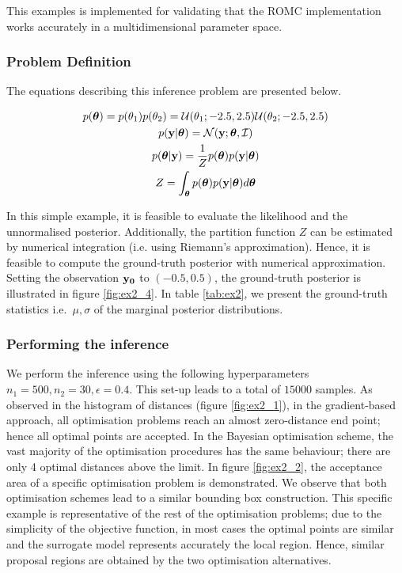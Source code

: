This examples is implemented for validating that the ROMC
implementation works accurately in a multidimensional parameter
space.

\subsubsection*{Problem Definition}

The equations describing this inference problem are presented below.

\begin{gather} \label{eq:ex1_equations}
  p(\boldsymbol{\theta}) = p(\theta_1)p(\theta_2)
  = \mathcal{U}(\theta_1; -2.5, 2.5) \mathcal{U}(\theta_2; -2.5, 2.5)\\
  p(\mathbf{y}|\boldsymbol{\theta}) = \mathcal{N}(\mathbf{y};\boldsymbol{\theta}, \mathcal{I})\\
  p(\boldsymbol{\theta}|\mathbf{y}) = \frac{1}{Z}p(\boldsymbol{\theta})p(\mathbf{y}|\boldsymbol{\theta})\\
  Z = \int_{\boldsymbol{\theta}} p(\boldsymbol{\theta})p(\mathbf{y}|\boldsymbol{\theta}) d\boldsymbol{\theta}
\end{gather}

\noindent
In this simple example, it is feasible to evaluate the likelihood and
the unnormalised posterior. Additionally, the partition function $Z$
can be estimated by numerical integration (i.e. using Riemann's
approximation). Hence, it is feasible to compute the ground-truth
posterior with numerical approximation. Setting the observation
$\mathbf{y_0}$ to $(-0.5,0.5)$, the ground-truth posterior is illustrated in
figure \ref{fig:ex2_4}. In table \ref{tab:ex2}, we present the
ground-truth statistics i.e.\ $\mu, \sigma$ of the marginal posterior
distributions.

\subsubsection*{Performing the inference}

We perform the inference using the following hyperparameters
$n_1=500, n_2=30, \epsilon=0.4$. This set-up leads to a total of
$15000$ samples. As observed in the histogram of distances (figure
\ref{fig:ex2_1}), in the gradient-based approach, all optimisation
problems reach an almost zero-distance end point; hence all optimal
points are accepted. In the Bayesian optimisation scheme, the vast
majority of the optimisation procedures has the same behaviour; there
are only 4 optimal distances above the limit. In figure
\ref{fig:ex2_2}, the acceptance area of a specific optimisation
problem is demonstrated. We observe that both optimisation schemes
lead to a similar bounding box construction. This specific example is
representative of the rest of the optimisation problems; due to the
simplicity of the objective function, in most cases the optimal points
are similar and the surrogate model represents accurately the local
region. Hence, similar proposal regions are obtained by the two
optimisation alternatives.

